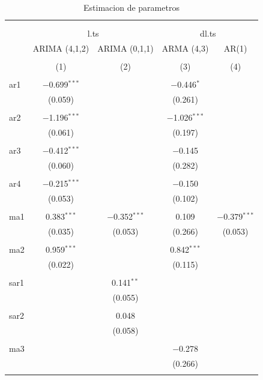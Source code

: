 \documentclass[11pt]{article}
\begin{document}
\begin{table}[!htbp] \centering 
  \caption{Estimacion de parametros} 
  \label{} 
\begin{tabular}{@{\extracolsep{5pt}}lcccc} 
\\[-1.8ex]\hline 
\hline \\[-1.8ex] 
\\[-1.8ex] & \multicolumn{2}{c}{l.ts} & \multicolumn{2}{c}{dl.ts} \\ 
 & ARIMA (4,1,2) & ARIMA (0,1,1) & ARMA (4,3) & AR(1) \\ 
\\[-1.8ex] & (1) & (2) & (3) & (4)\\ 
\hline \\[-1.8ex] 
 ar1 & $-$0.699$^{***}$ &  & $-$0.446$^{*}$ &  \\ 
  & (0.059) &  & (0.261) &  \\ 
  & & & & \\ 
 ar2 & $-$1.196$^{***}$ &  & $-$1.026$^{***}$ &  \\ 
  & (0.061) &  & (0.197) &  \\ 
  & & & & \\ 
 ar3 & $-$0.412$^{***}$ &  & $-$0.145 &  \\ 
  & (0.060) &  & (0.282) &  \\ 
  & & & & \\ 
 ar4 & $-$0.215$^{***}$ &  & $-$0.150 &  \\ 
  & (0.053) &  & (0.102) &  \\ 
  & & & & \\ 
 ma1 & 0.383$^{***}$ & $-$0.352$^{***}$ & 0.109 & $-$0.379$^{***}$ \\ 
  & (0.035) & (0.053) & (0.266) & (0.053) \\ 
  & & & & \\ 
 ma2 & 0.959$^{***}$ &  & 0.842$^{***}$ &  \\ 
  & (0.022) &  & (0.115) &  \\ 
  & & & & \\ 
 sar1 &  & 0.141$^{**}$ &  &  \\ 
  &  & (0.055) &  &  \\ 
  & & & & \\ 
 sar2 &  & 0.048 &  &  \\ 
  &  & (0.058) &  &  \\ 
  & & & & \\ 
 ma3 &  &  & $-$0.278 &  \\ 
  &  &  & (0.266) &  \\ 
  & & & & \\ 

\end{tabular}
\end{table}
\end{document}

